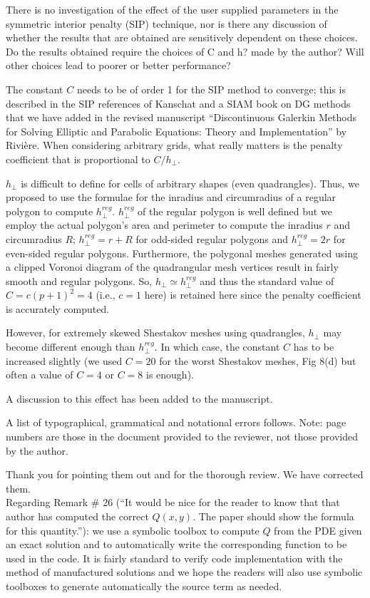 \documentclass{article}
\begin{document}
\bigskip

{
\color{blue}
There is no investigation of the effect of the user supplied parameters in
the symmetric interior penalty (SIP) technique, nor is there any discussion
of whether the results that are obtained are sensitively dependent on these
choices. Do the results obtained require the choices of C and h? made by
the author? Will other choices lead to poorer or better performance?
}


The constant $C$ needs to be of order 1 for the SIP method to converge; this is described in the SIP references of Kanschat and a SIAM book on DG methods that we have added in the revised manuscript ``Discontinuous Galerkin Methods for Solving Elliptic and Parabolic Equations:  Theory and Implementation'' by Rivi\`ere. When considering arbitrary grids, what really matters is the penalty coefficient that is proportional to $C/h_\perp$.

$h_\perp$ is difficult to 
define for cells of arbitrary shapes (even quadrangles). Thus, we proposed to use the formulae
for the inradius and circumradius of a regular polygon to compute $h^{reg}_\perp$. $h^{reg}_\perp$ of the regular polygon
is well defined but we employ the actual polygon's area and perimeter to
compute the inradius $r$ and circumradius $R$; $h^{reg}_\perp=r+R$ for odd-sided regular polygons and $h^{reg}_\perp=2r$
for even-sided regular polygons. Furthermore, the polygonal meshes generated using a clipped Voronoi diagram of the
quadrangular mesh vertices result in fairly smooth and regular polygons. So, $h_\perp \simeq h^{reg}_\perp$ and thus the standard value of $C=c(p+1)^2=4$ (i.e., $c=1$ here) is retained here since the penalty coefficient is accurately computed. 


However, for extremely skewed Shestakov meshes using quadrangles, $h_\perp $ may become different enough than $h^{reg}_\perp$. In which case, the constant $C$ has to be increased slightly (we used $C=20$ for the worst Shestakov meshes, Fig 8(d) but often a value of $C=4$ or $C=8$ is enough). 

A discussion to this effect has been added to the manuscript.

\bigskip


{
\color{blue}
A list of typographical, grammatical and notational errors follows. Note:
page numbers are those in the document provided to the reviewer, not those
provided by the author.
}

Thank you for pointing them out and for the thorough review. We have corrected them. \\

Regarding Remark \# 26 (``It would be nice for the reader to know that that author has computed the correct $Q(x, y)$. The paper should show the formula for this quantity.''): we use a symbolic toolbox to compute $Q$ from the PDE given an exact solution and to automatically write the corresponding function to be used in the code. It is fairly standard to verify code implementation with the method of manufactured solutions and we hope the readers will also use symbolic toolboxes to generate automatically the source term as needed.

\bigskip
\end{document}
